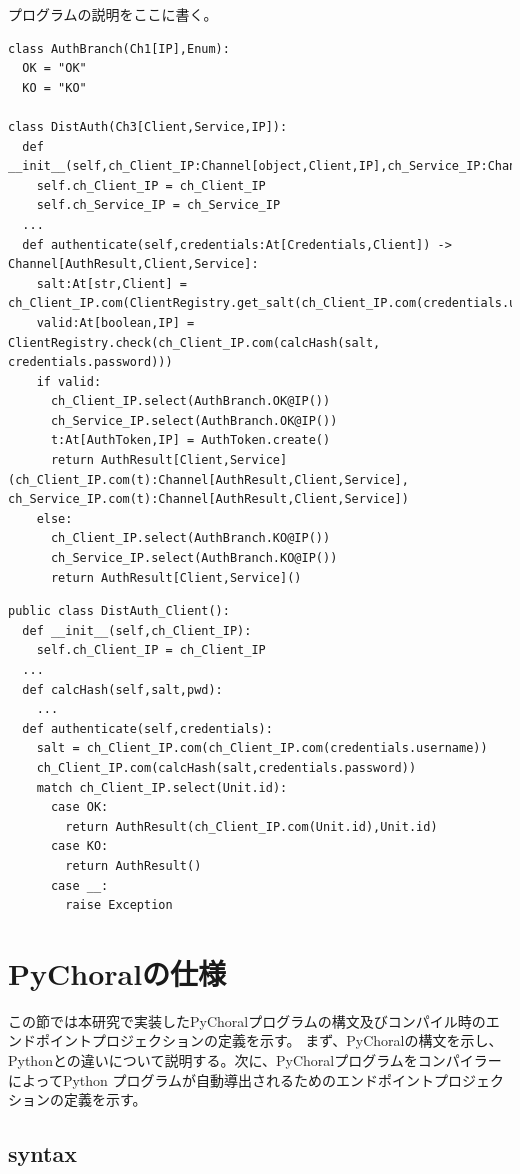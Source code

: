 \documentclass{thesis}
\begin{document}
プログラムの説明をここに書く。
\begin{lstlisting}[caption=PyChoralプログラムの例(分散認証),label=pychoral]
class AuthBranch(Ch1[IP],Enum):
  OK = "OK"
  KO = "KO"

class DistAuth(Ch3[Client,Service,IP]):
  def __init__(self,ch_Client_IP:Channel[object,Client,IP],ch_Service_IP:Channel[object,Service,IP]):
    self.ch_Client_IP = ch_Client_IP
    self.ch_Service_IP = ch_Service_IP
  ...
  def authenticate(self,credentials:At[Credentials,Client]) -> Channel[AuthResult,Client,Service]:
    salt:At[str,Client] = ch_Client_IP.com(ClientRegistry.get_salt(ch_Client_IP.com(credentials.username)))
    valid:At[boolean,IP] = ClientRegistry.check(ch_Client_IP.com(calcHash(salt, credentials.password)))
    if valid:
      ch_Client_IP.select(AuthBranch.OK@IP())
      ch_Service_IP.select(AuthBranch.OK@IP())
      t:At[AuthToken,IP] = AuthToken.create()
      return AuthResult[Client,Service](ch_Client_IP.com(t):Channel[AuthResult,Client,Service], ch_Service_IP.com(t):Channel[AuthResult,Client,Service])
    else:
      ch_Client_IP.select(AuthBranch.KO@IP())
      ch_Service_IP.select(AuthBranch.KO@IP())
      return AuthResult[Client,Service]()
\end{lstlisting}
\begin{lstlisting}[caption=生成されたClientのPythonプログラム例(分散認証),label=java]
public class DistAuth_Client():
  def __init__(self,ch_Client_IP):
    self.ch_Client_IP = ch_Client_IP
  ... 
  def calcHash(self,salt,pwd):
    ... 
  def authenticate(self,credentials):
    salt = ch_Client_IP.com(ch_Client_IP.com(credentials.username))
    ch_Client_IP.com(calcHash(salt,credentials.password))
    match ch_Client_IP.select(Unit.id):
      case OK:
        return AuthResult(ch_Client_IP.com(Unit.id),Unit.id)
      case KO:
        return AuthResult()
      case __:
        raise Exception
\end{lstlisting}
\section{PyChoralの仕様}
この節では本研究で実装したPyChoralプログラムの構文及びコンパイル時のエンドポイントプロジェクションの定義を示す。
まず、PyChoralの構文を示し、Pythonとの違いについて説明する。次に、PyChoralプログラムをコンパイラーによってPython
プログラムが自動導出されるためのエンドポイントプロジェクションの定義を示す。
\subsection{syntax}
\end{document}
